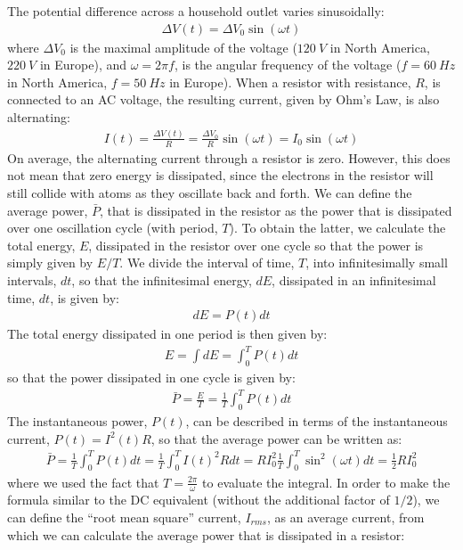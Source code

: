 The potential difference across a household outlet varies sinusoidally:
\begin{align*}
\Delta V (t) = \Delta V_0 \sin(\omega t)
\end{align*}
where $\Delta V_0$ is the maximal amplitude of the voltage ($\SI{120}{V}$ in North America, $\SI{220}{V}$ in Europe), and $\omega = 2\pi f$, is the angular frequency of the voltage ($f=\SI{60}{Hz}$ in North America, $f=\SI{50}{Hz}$ in Europe). When a resistor with resistance, $R$, is connected to an AC voltage, the resulting current, given by Ohm's Law, is also alternating:
\begin{align*}
I(t)=\frac{\Delta V(t)}{R}=\frac{\Delta V_0}{R}\sin(\omega t)=I_0\sin(\omega t)
\end{align*}
On average, the alternating current through a resistor is zero. However, this does not mean that zero  energy is dissipated, since the electrons in the resistor will still collide with atoms as they oscillate back and forth. We can define the average power, $\bar P$, that is dissipated in the resistor as the  power that is dissipated over one oscillation cycle (with period, $T$). To obtain the latter, we calculate the total energy, $E$, dissipated in the resistor over one cycle so that the power is simply given by $E/T$. We divide the interval of time, $T$, into infinitesimally small intervals, $dt$, so that the infinitesimal energy, $dE$, dissipated in an infinitesimal time, $dt$, is given by:
\begin{align*}
dE=P(t) dt
\end{align*}
The total energy dissipated in one period is then given by:
\begin{align*}
E=\int dE = \int_0^T P(t)dt
\end{align*}
so that the power dissipated in one cycle is given by:
\begin{align*}
\bar P=\frac{E}{T}=\frac{1}{T}\int_0^T P(t)dt
\end{align*}
The instantaneous power, $P(t)$, can be described in terms of the instantaneous current, $P(t)=I^2(t)R$, so that the average power can be written as:
\begin{align*}
\bar P = \frac{1}{T}\int_0^TP(t)dt=\frac{1}{T}\int_0^TI(t)^2Rdt=RI_0^2\frac{1}{T}\int_0^T\sin^2(\omega t)dt=\frac{1}{2}RI_0^2
\end{align*}
where we used the fact that $T=\frac{2\pi}{\omega}$ to evaluate the integral. In order to make the formula similar to the DC equivalent (without the additional factor of $1/2$), we can define the ``root mean square'' current, $I_{rms}$, as an average current, from which we can calculate the average power that is dissipated in a resistor:
